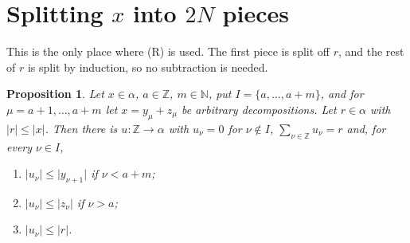 \documentclass[11pt]{article}
\newtheorem{proposition}[theorem]{Proposition}
\theoremstyle{definition}
\theoremstyle{remark}
\newcommand{\abs}[1]{\lvert #1\rvert}
\newcommand{\Z}{\mathbb Z}
\begin{document}
\section{Splitting \(x\) into \(2N\) pieces}

This is the only place where (R) is used. The first piece is split off \(r\), and the rest
of \(r\) is split by induction, so no subtraction is needed.

\begin{proposition}\label{prop:split-general}
  Let \(x \in \alpha\), \(a \in \Z\), \(m \in \mathbb N\), put \(I = \{a, \dots, a+m\}\), and
  for \(\mu = a+1, \dots, a+m\) let \(x = y_\mu + z_\mu\) be arbitrary decompositions. Let
  \(r \in \alpha\) with \(\abs{r} \le \abs{x}\). Then there is \(u \colon \Z \to \alpha\) with
  \(u_\nu = 0\) for \(\nu \notin I\), \(\sum_{\nu \in \Z} u_\nu = r\) and, for every
  \(\nu \in I\),
  \begin{enumerate}
    \item[(a)] \(\abs{u_\nu} \le \abs{y_{\nu+1}}\) if \(\nu < a+m\);
    \item[(b)] \(\abs{u_\nu} \le \abs{z_\nu}\) if \(\nu > a\);
    \item[(c)] \(\abs{u_\nu} \le \abs{r}\).
  \end{enumerate}
\end{proposition}
\end{document}

